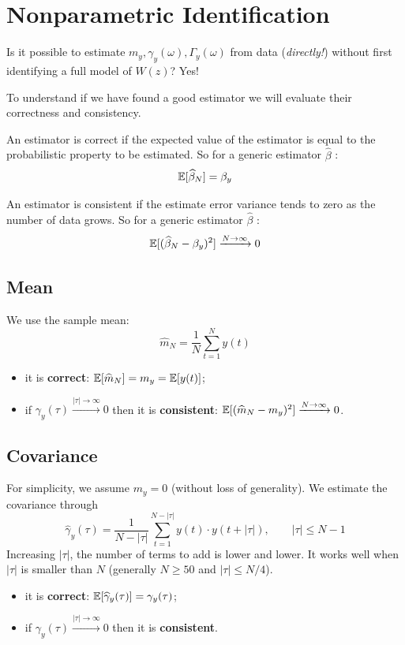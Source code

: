 \section{Nonparametric Identification}

Is it possible to estimate $m_y, \gamma_y(\omega), \Gamma_y(\omega)$ from data (\emph{directly!}) without first identifying a full model of $W(z)$? Yes!

To understand if we have found a good estimator we will evaluate their correctness and consistency.

\begin{defn}[Correctness]
    An estimator is correct if the expected value of the estimator is equal to the probabilistic property to be estimated. So for a generic estimator $\hat\beta$ :
    \[
    \mathbb{E}[\widehat\beta_N]=\beta_y
    \]
\end{defn}

\begin{defn}[Consistency]
    An estimator is consistent if the estimate error variance tends to zero as the number of data grows. So for a generic estimator $\hat\beta$ :
    \[
    \mathbb{E}[(\widehat\beta_N-\beta_y)^2]\xrightarrow{N\to\infty} 0
    \]
\end{defn}

\subsection{Mean}

We use the sample mean:
\[
	\boxed{\hat{m}_{N}=\frac{1}{N}\sum_{t=1}^{N} y(t)} 
\]
\begin{itemize}
	\item it is \textbf{correct}: $\mathbb{E}[\widehat{m}_{N}]=m_y=\mathbb{E}[y(t)]$;
	\item if $\gamma _{y}(\tau )\xrightarrow{|\tau|\to\infty} 0$ then it is \textbf{consistent}: $\mathbb{E}[(\widehat{m}_{N}-m_y)^2]\xrightarrow{N\to\infty} 0$.
\end{itemize}

\subsection{Covariance}
For simplicity, we assume $m_y=0$ (without loss of generality). We estimate the covariance through
\[
	\boxed{\hat{\gamma}_{y}(\tau) = \frac{1}{N-|\tau|} \sum_{t=1}^{N-|\tau|} y(t)\cdot y(t+|\tau|), \qquad |\tau|\leq N-1}
\]
Increasing $|\tau|$, the number of terms to add is lower and lower. It works well when $|\tau|$ is smaller than $N$ (generally $N\geq 50$ and $|\tau|\leq N/4$).
\begin{itemize}
	\item it is \textbf{correct}: $\mathbb{E}[\widehat{\gamma}_{y}(\tau)]=\gamma_{y}(\tau)$;
	\item if $\gamma _{y}(\tau )\xrightarrow{|\tau|\to\infty} 0$ then it is \textbf{consistent}.
\end{itemize}

